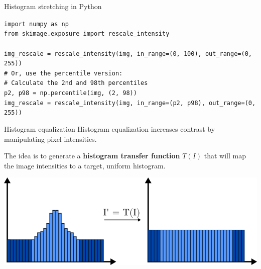 \documentclass[9pt, aspectratio=169]{beamer}
\begin{document}
\begin{frame}
    {Histogram stretching in Python}
    \begin{codebox}
        \texttt{import numpy as np\\
            from skimage.exposure import rescale\_intensity\\
            \\
            img\_rescale = rescale\_intensity(img, in\_range=(0, 100), out\_range=(0, 255))\\
            \pause
            \# Or, use the percentile version:\\
            \# Calculate the 2nd and 98th percentiles\\
            p2, p98 = np.percentile(img, (2, 98))\\
            img\_rescale = rescale\_intensity(img, in\_range=(p2, p98), out\_range=(0, 255))
        }
    \end{codebox}
\end{frame}

\begin{frame}
    {Histogram equalization}
    Histogram equalization increases contrast by manipulating pixel intensities.

    The idea is to generate a \textbf{histogram transfer function} $T(I)$ that will map the image intensities to a target, uniform histogram.
    \centering

    \includegraphics[width=.7\textwidth]{histo_eq_schematic.png}
\end{frame}
\end{document}
